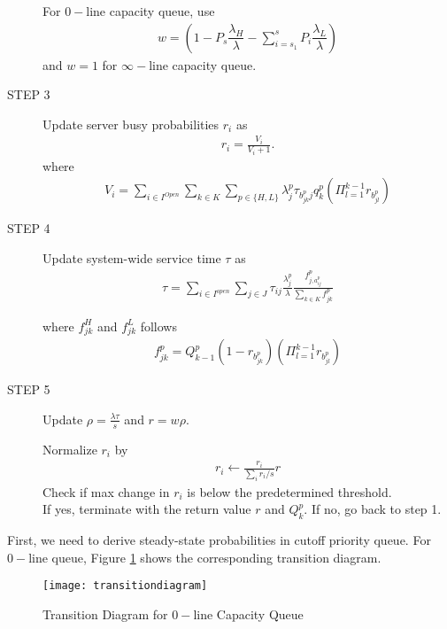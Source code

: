 \documentclass{article}
\begin{document}
\begin{description}
For $0-$line capacity queue, use
\begin{align}
w = (1-P_s \dfrac{\lambda_H}{\lambda}-\sum_{i=s_1}^s P_{i} \dfrac{\lambda_L}{\lambda}) 
\end{align}
and $w=1$ for $\infty-$line capacity queue.


\item[STEP 3] Update server busy probabilities $r_i$ as
\begin{align}
r_i = \frac{V_i}{V_i+1}.
\end{align}
where
\begin{align}
V_i = \sum_{i \in I^{Open}} \sum_{k \in K} \sum_{p \in \{H,L\}} \lambda^p_j \tau_{b^p_{jk}j} q^p_k (\Pi^{k-1}_{l=1} r_{b^p_{jl}})
\end{align}


\item[STEP 4] Update system-wide service time $\tau$ as
\begin{align}
\tau = \sum_{i \in I^{open}} \sum_{j \in J} \tau_{ij} \frac{\lambda^p_j}{\lambda}\frac{f^p_{j,a^p_{ij}}}{\sum_{k \in K} f^p_{jk}}
\end{align}

where $f^H_{jk}$ and $f^L_{jk}$ follows
\begin{align}
f^p_{jk} = Q^p_{k-1} (1-r_{b^p_{jk}}) (\Pi^{k-1}_{l=1} r_{b^p_{jl}})
\end{align}

\item[STEP 5] Update $\rho=\frac{\lambda \tau}{s}$ and $r = w \rho$.

Normalize $r_i$ by
\begin{align}
r_i \leftarrow \frac{r_i}{\sum_i r_i/s} r
\end{align}
Check if max change in $r_i$ is below the predetermined threshold. \\
If yes, terminate with the return value $r$ and $Q_k^p$. If no, go back to step 1.

\end{description}

First, we need to derive steady-state probabilities in cutoff priority queue. For $0-$line queue, Figure \ref{fig:transitiondiagram} shows the corresponding transition diagram.

\begin{figure}
\centering
\texttt{[image: transitiondiagram]}
\caption{Transition Diagram for $0-$line Capacity Queue}
\label{fig:transitiondiagram}
\end{figure}
\end{document}
